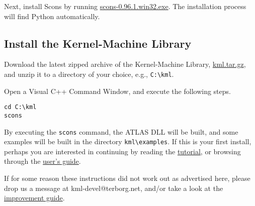 \documentclass{article}
\begin{document}
Next, install Scons by running 
\href{http://prdownloads.sourceforge.net/scons/scons-0.96.1.win32.exe?download}{scons-0.96.1.win32.exe}. 
The installation process will find
Python automatically.

\subsection{Install the Kernel-Machine Library}
Download the latest zipped archive of the Kernel-Machine Library, 
\href{http://www.terborg.net/cgi-bin/viewcvs.cgi/trunk/kml.tar.gz?view=tar}{kml.tar.gz}, 
and unzip it to a directory of your choice, e.g., \texttt{C:\textbackslash kml}.

Open a Visual C++ Command Window, and execute the following steps.
%
\begin{verbatim}
cd C:\kml
scons
\end{verbatim}
%
By executing the \texttt{scons} command, the ATLAS DLL will be built, 
and some examples will be built in the directory \texttt{kml\textbackslash examples}.
If this is your first install, perhaps you are interested in continuing 
by reading the \href{\kmlroot/tutorial.html}{tutorial}, or browsing through 
the \href{\kmlroot/contents.html}{user's guide}.

If for some reason these instructions did not work out as advertised here,
please drop us a message at kml-devel@terborg.net, and/or take a look
at the \href{\kmlroot/improve.html}{improvement guide}.

% 



\end{document}
